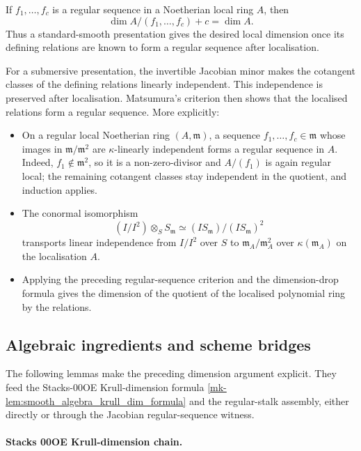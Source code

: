 If \(f_1,\ldots,f_c\) is a regular sequence in a Noetherian local ring
\(A\), then
\[
  \dim A/(f_1,\ldots,f_c)+c=\dim A.
\]
Thus a standard-smooth presentation gives the desired local dimension
once its defining relations are known to form a regular sequence after
localisation.

For a submersive presentation, the invertible Jacobian minor makes the
cotangent classes of the defining relations linearly independent.  This
independence is preserved after localisation.  Matsumura's criterion then
shows that the localised relations form a regular sequence.  More explicitly:
\begin{itemize}
  \item On a regular local Noetherian ring \((A, \mathfrak m)\), a
    sequence \(f_1, \dots, f_c \in \mathfrak m\) whose images in
    \(\mathfrak m / \mathfrak m^2\) are \(\kappa\)-linearly
    independent forms a regular sequence in \(A\).  Indeed, \(f_1\notin
    \mathfrak m^2\), so it is a non-zero-divisor and \(A/(f_1)\) is again
    regular local; the remaining cotangent classes stay independent in
    the quotient, and induction applies.

  \item The conormal isomorphism
    \[
      (I/I^2) \otimes_S S_{\mathfrak m}
      \simeq (I S_{\mathfrak m})/(I S_{\mathfrak m})^2
    \]
    transports linear independence from \(I/I^2\) over \(S\) to
    \(\mathfrak m_A / \mathfrak m_A^2\) over \(\kappa(\mathfrak m_A)\)
    on the localisation \(A\).
  \item Applying the preceding regular-sequence criterion and the
    dimension-drop formula gives the dimension of the quotient of the
    localised polynomial ring by the relations.
\end{itemize}

\subsection{Algebraic ingredients and scheme bridges}
\label{mk-subsec:codim1_substrate_lemmas}

The following lemmas make the preceding dimension argument explicit. They feed
the Stacks-00OE Krull-dimension formula
\ref{mk-lem:smooth_algebra_krull_dim_formula} and the regular-stalk assembly,
either directly or through the Jacobian regular-sequence witness.

\paragraph{Stacks 00OE Krull-dimension chain.}

